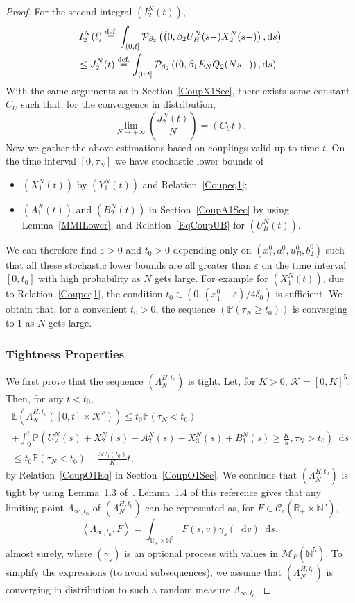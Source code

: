 \documentclass[english]{amsart}
\newcommand{\N}{\ensuremath{\mathbb{N}}}
\newcommand{\R}{\ensuremath{\mathbb{R}}}
\newcommand{\E}{\ensuremath{\mathbb{E}}}
\renewcommand{\P}{\ensuremath{\mathbb{P}}}
\newcommand{\diff}{\mathop{}\mathopen{}\mathrm{d}}
\newcommand{\cal}[1]{\ensuremath{\mathcal{#1}}}
\newcommand\croc[1]{\left\langle #1\right\rangle}
\newcommand\steq[1]{\stackrel{\text{\rm #1.}}{=}}
\def\eps{\varepsilon}
\numberwithin{proposition}{section}
\begin{document}
\begin{proof}
  For the second integral $(I_2^N(t))$,
\begin{multline*}
  I_2^N(t)\steq{def}\int_{(0,t]}{\cal P}_{\beta_2}\left(\left(0,\beta_2U_B^N(s{-}) X_2^N(s{-})\right),\diff s\right)\\ 
\le  J_2^N(t)\steq{def} \int_{(0,t]}{\cal P}_{\beta_2}\left(\left(0,\beta_1E_N Q_2(Ns{-})\right),\diff s\right).
\end{multline*}
   With the same arguments as in Section~\ref{CoupX1Sec}, there exists some constant $C_U$ such that, for the convergence in distribution,
   \[
   \lim_{N\to+\infty} \left(\frac{J_2^N(t)}{N}\right)=(C_Ut). 
   \]
   Now we gather the above estimations based on couplings valid up to time $t$. On the time interval $[0,\tau_N]$ we have stochastic lower bounds of
   \begin{itemize}
   \item $(X_1^N(t))$ by $(Y_1^N(t))$ and Relation~\eqref{Coupeq1};
   \item $(A_1^N(t))$ and $(B_2^N(t))$ in Section~\ref{CoupA1Sec} by using Lemma~\ref{MMILower}, and Relation~\eqref{EqCoupUB} for $(U_B^N(t))$.
   \end{itemize}
We can therefore find $\eps{>}0$ and $t_0>0$ depending only on $(x_1^0,a_1^0,u_B^0,b_2^0)$ such that all these stochastic lower bounds are all greater than $\eps$ on the time interval $[0,t_0]$ with high probability as $N$ gets large. For example for $(X_1^N(t))$, due to Relation~\eqref{Coupeq1}, the condition $t_0{\in}(0,(x_1^0{-}\eps)/4\delta_0)$ is sufficient. We obtain that, for a convenient $t_0{>}0$,  the sequence $(\P(\tau_N{\ge}t_0))$ is converging to $1$ as $N$ gets large.
\subsubsection{Tightness Properties}\label{CoupFast}
   We first prove that the sequence $(\Lambda_N^{H,t_0})$ is tight. Let, for $K{>}0$,  ${\cal K}{=}[0,K]^5$. Then, for any $t{<}t_0$,
\begin{multline*}
   \E\left(\Lambda_N^{H,t_0}\left([0,t]{\times}{\cal K}^c\right)\right)
   \le t_0\P(\tau_N<t_0)\\+\int_0^{t}\P\left(U_A^N(s){+}X_2^N(s){+}A_2^N(s){+}X_3^N(s){+}B_1^N(s)\ge \frac{K}{5},\tau_N>t_0\right)\diff s
\\   \le t_0\P(\tau_N<t_0)+\frac{5C_0(t_0)}{K}t,
\end{multline*}
by Relation~\eqref{CoupO1Eq} in Section~\ref{CoupO1Sec}. We conclude that $(\Lambda_N^{H,t_0})$ is tight by using Lemma~1.3 of~\citet{Kurtz1992}. Lemma~1.4 of this reference gives that any limiting point $\Lambda_{\infty,t_0}$ of $(\Lambda_N^{H,t_0})$ can be represented as, for $F{\in}{\cal C}_c(\R_+{\times}\N^5)$, 
\begin{equation}\label{GamEq}
\croc{\Lambda_{\infty,t_0},F}=\int_{\R_+{\times}\N^5} F(s,v)\gamma_s(\diff v)\diff s,
\end{equation}
almost surely, where $(\gamma_s)$ is an optional process with values in ${\cal M}_P(\N^5)$. 
To simplify the expressions (to avoid subsequences), we assume that $(\Lambda_N^{H,t_0})$ is converging in distribution to such a random measure $\Lambda_{\infty,t_0}$. 


\end{proof}
\end{document}
